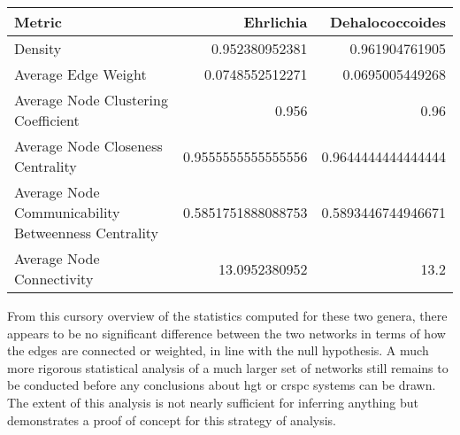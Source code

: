 \begin{center}
    \begin{tabular}{l|r r}
        Metric & Ehrlichia & Dehalococcoides\\
        \hline
        Density & 0.952380952381&0.961904761905\\
        Average Edge Weight & 0.0748552512271&0.0695005449268\\
        Average Node Clustering Coefficient & 0.956&0.96\\
        Average Node Closeness Centrality & 0.9555555555555556&0.9644444444444444\\
        Average Node Communicability Betweenness Centrality & 0.5851751888088753 &0.5893446744946671\\
        Average Node Connectivity & 13.0952380952 & 13.2\\
    \end{tabular}
\end{center}
From this cursory overview of the statistics computed for these two genera, there appears to be no significant difference between  the two networks in terms of how the edges are connected or weighted, in line with the null hypothesis.
A much more rigorous statistical analysis of a much larger set of networks still remains to be conducted before any conclusions about \ac{hgt} or \ac{crspc} systems can be drawn.
The extent of this analysis is not nearly sufficient for inferring anything but demonstrates a proof of concept for this strategy of analysis.
